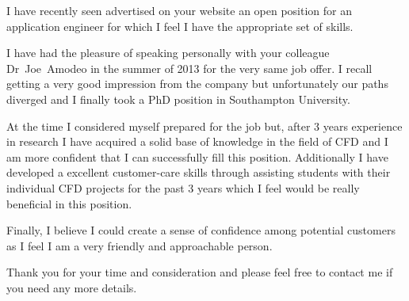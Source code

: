 \documentclass[10pt,stdletter,dateno,sigleft]{newlfm} %
\begin{document}
\begin{newlfm}


I have recently seen advertised on your website an open position for an application
engineer for which I feel I have the appropriate set of skills.

I have had the pleasure of speaking personally with your colleague Dr~Joe~Amodeo in the
summer of 2013 for the very same job offer. I recall getting a very good
impression from the company but unfortunately our paths diverged and I finally took a PhD
position in Southampton University.

At the time I considered myself prepared for the job but, after 3 years experience in
research I have acquired a solid base of knowledge in the field of CFD and I am more
confident that I can successfully fill this position. Additionally I have developed a
excellent customer-care skills through assisting students with their individual CFD
projects for the past 3 years which I feel would be really beneficial in this position.

Finally, I believe I could create a sense of confidence among potential customers
as I feel I am a very friendly and approachable person.

Thank you for your time and consideration and please feel free to contact me if you need
any more details.

\end{newlfm}
\end{document}
